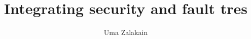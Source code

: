 \documentclass{scrreprt}
\begin{document}
\title{Integrating security and fault tres}
\author{Uma Zalakain}
\maketitle
{}

\newpage
\vfill{}
\doclicenseThis
\newpage

\setcounter{tocdepth}{2}
\tableofcontents
\newpage
{}





\newpage
\begin{appendices}
\end{appendices}
\end{document}
